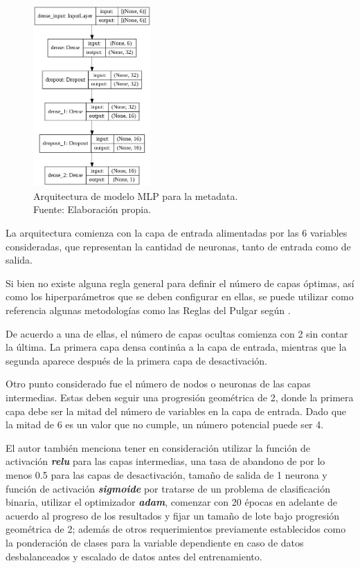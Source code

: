 \begin{figure}[!ht]
	\begin{center}
		\includegraphics[width=0.40\textwidth]{4/figures/model_mlp_metadata.png}
		\caption[Arquitectura de modelo MLP para la metadata]{Arquitectura de modelo MLP para la metadata.\\
			Fuente: Elaboración propia.}
		\label{4:fig34}
	\end{center}
\end{figure}

La arquitectura comienza con la capa de entrada alimentadas por las 6 variables consideradas, que representan la cantidad de neuronas, tanto de entrada como de salida.

Si bien no existe alguna regla general para definir el número de capas óptimas, así como los hiperparámetros que se deben configurar en ellas, se puede utilizar como referencia algunas metodologías como las Reglas del Pulgar según \cite{tec_ranjan2019thumbrules}.

De acuerdo a una de ellas, el número de capas ocultas comienza con 2 sin contar la última. La primera capa densa continúa a la capa de entrada, mientras que la segunda aparece después de la primera capa de desactivación.

Otro punto considerado fue el número de nodos o neuronas de las capas intermedias. Estas deben seguir una progresión geométrica de 2, donde la primera capa debe ser la mitad del número de variables en la capa de entrada. Dado que la mitad de 6 es un valor que no cumple, un número potencial puede ser 4.

El autor también menciona tener en consideración utilizar la función de activación \textit{\textbf{relu}} para las capas intermedias, una tasa de abandono de por lo menos 0.5 para las capas de desactivación, tamaño de salida de 1 neurona y función de activación \textit{\textbf{sigmoide}} por tratarse de un problema de clasificación binaria, utilizar el optimizador \textit{\textbf{adam}}, comenzar con 20 épocas en adelante de acuerdo al progreso de los resultados y fijar un tamaño de lote bajo progresión geométrica de 2; además de otros requerimientos previamente establecidos como la ponderación de clases para la variable dependiente en caso de datos desbalanceados y escalado de datos antes del entrenamiento.

